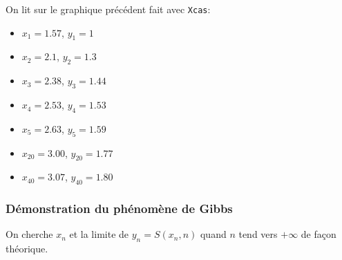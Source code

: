 \documentclass[a4paper,11pt]{book}
\begin{document}
On lit sur le graphique pr\'ec\'edent fait avec {\tt Xcas}:
\begin{itemize}
\item $x_1=1.57$, $y_1=1$
\item $x_2=2.1$, $y_2=1.3$
\item $x_3=2.38$, $y_3=1.44$
\item $x_4=2.53$, $y_4=1.53$
\item $x_5=2.63$, $y_5=1.59$
\item $x_20=3.00$, $y_20=1.77$
\item $x_40=3.07$, $y_40=1.80$
\end{itemize}

\subsubsection{D\'emonstration du ph\'enom\`ene de Gibbs}
On cherche $x_n$ et la limite de $y_n=S(x_n,n)$ quand $n$ tend vers $+\infty$ 
de fa\c{c}on th\'eorique.\\
\end{document}
